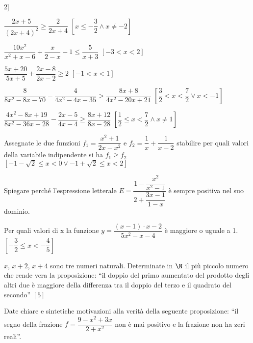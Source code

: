 \begin{esercizio}[*]
\begin{enumeratea}
2\right]\)
\item \(\dfrac{2x+5}{(2x+4)^2}\ge \dfrac 2{2x+4}\) 
 \hfill \(\left[x\le -\dfrac 3 2 \wedge x \neq -2\right]\)
\item \(\dfrac{10x^2}{x^2+x-6}+\dfrac x{2-x}-1\le \dfrac 5{x+3}\) 
 \hfill \(\left[-3<x<2\right]\)
\item \(\dfrac{5x+20}{5x+5}+\dfrac{2x-8}{2x-2}\ge 2\) 
 \hfill \(\left[-1<x<1\right]\)
\item \(\dfrac 8{8x^2-8x-70}-\dfrac 4{4x^2-4x-35}>\dfrac{8x+8}{4x^2-20x+21}\)
 \hfill \(\left[\dfrac 3 2<x<\dfrac 7 2\vee x<-1\right]\)
\item \(\dfrac{4x^2-8x+19}{8x^2-36x+28}-\dfrac{2x-5}{4x-4}\ge 
\dfrac{8x+12}{8x-28}\)
 \hfill \(\left[\dfrac 1 2\le x<\dfrac 7 2 \wedge x \neq 1\right]\)
\end{enumeratea}
\end{esercizio}

\begin{esercizio}[*]
 \label{ese:4.68}
Assegnate le due funzioni \(f_1=\dfrac{x^2+1}{2x-x^2}\) e \(f_2=\dfrac 1 
x+\dfrac 
1{x-2}\) stabilire per quali valori della variabile indipendente si ha 
\(f_1\ge 
f_2\)
 \hfill \(\left[-1-\sqrt 2\le x<0\vee -1+\sqrt 2\le x<2\right]\)
\end{esercizio}

\begin{esercizio}
 \label{ese:4.69}
Spiegare perché l'espressione letterale 
\(E=\dfrac{1-\dfrac{x^2}{x^2-1}}{2+\dfrac{3x-1}{1-x}}\) è sempre positiva nel 
suo 
dominio.
\end{esercizio}

\begin{esercizio}[*]
 \label{ese:4.70}
Per quali valori di x la funzione \(y=\dfrac{(x-1)\cdot x-2}{5x^2-x-4}\) è 
maggiore 
o uguale a 1.
 \hfill \(\left[-\dfrac 3 2\le x<-\dfrac 4 5\right]\)
\end{esercizio}

\begin{esercizio}[*]
 \label{ese:4.71}
\( x \), \( x+2 \), \( x+4 \) sono tre numeri naturali. Determinate in \( 
\N \) il 
più piccolo numero che rende vera la proposizione: ``il doppio del primo 
aumentato del prodotto degli altri due è maggiore della differenza tra il 
doppio 
del terzo e il quadrato del secondo''
 \hfill \(\left[5\right]\)
\end{esercizio}

\begin{esercizio}
 \label{ese:4.72}
Date chiare e sintetiche motivazioni alla verità della seguente proposizione: 
``il segno della frazione \(f=\dfrac{9-x^2+3x}{2+x^2}\) non è mai positivo e 
la 
frazione non ha zeri reali''.
\end{esercizio}

